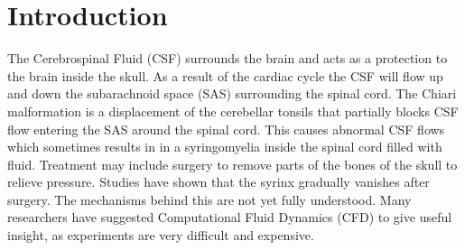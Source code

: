 \chapter{Introduction}
The Cerebrospinal Fluid (CSF) surrounds the brain and acts as a protection to the brain inside the skull. As a result of the cardiac cycle the CSF will flow up and down the subarachnoid space (SAS) surrounding the spinal cord. The Chiari malformation is a displacement of the cerebellar tonsils that partially blocks CSF flow entering the SAS around the spinal cord. This causes abnormal CSF flows which sometimes results in in a syringomyelia inside the spinal cord filled with fluid. Treatment may include surgery to remove parts of the bones of the skull to relieve pressure. Studies have shown that the syrinx gradually vanishes after surgery. The mechanisms behind this are not yet fully understood. Many researchers have suggested Computational Fluid Dynamics (CFD) to give useful insight, as experiments are very difficult and expensive. 

